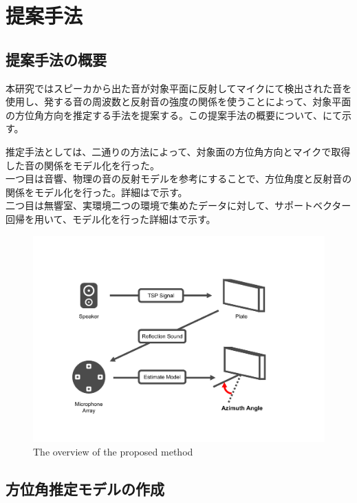 \section{提案手法}
\label{chap:proposed_method}
\subsection{提案手法の概要}
\label{sec:proposed_method_overviews}
本研究ではスピーカから出た音が対象平面に反射してマイクにて検出された音を使用し、発する音の周波数と反射音の強度の関係を使うことによって、対象平面の方位角方向を推定する手法を提案する。この提案手法の概要について、にて示す。

推定手法としては、二通りの方法によって、対象面の方位角方向とマイクで取得した音の関係をモデル化を行った。\\
一つ目は音響、物理の音の反射モデルを参考にすることで、方位角度と反射音の関係をモデル化を行った。詳細はで示す。\\
二つ目は無響室、実環境二つの環境で集めたデータに対して、サポートベクター回帰を用いて、モデル化を行った詳細はで示す。

\begin{figure}[ht]
    \centering
    \includegraphics[width=\linewidth]{images/2_proposed_method.pdf}
    \caption{The overview of the proposed method}
    \label{fig:proposed_method_overview}
\end{figure}

\subsection{方位角推定モデルの作成}
\label{sec:self_by_myself}
